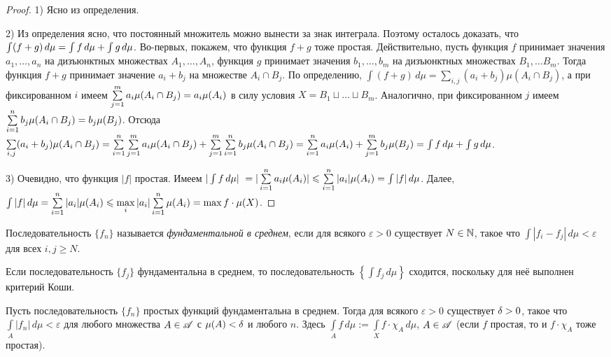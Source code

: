 \documentclass[10pt]{article}
\newcommand{\ve}{\varepsilon}
\begin{document}
\begin{proof}
1) Ясно из определения.

2) Из определения ясно, что постоянный множитель можно вынести за
знак интеграла. Поэтому осталось доказать, что $\int(f+g)\,d\mu
\bw=\int f\,d\mu+\int g\,d\mu$. Во-первых, покажем, что функция
$f+g$ тоже простая. Действительно, пусть функция $f$ принимает
значения $a_1,\ldots,a_n$ на дизъюнктных множествах
$A_1,\ldots,A_n$, функция $g$ принимает значения $b_1,\ldots,b_m$ на
дизъюнктных множествах $B_1,\ldots B_m$. Тогда функция $f+g$
принимает значение $a_i+b_j$ на множестве $A_i\cap B_j$. По
определению, $\int(f+g)\,d\mu=\sum\limits_{i,j}(a_i+b_j)\mu(A_i\cap
B_j)$, а при фиксированном $i$ имеем
$\sum\limits_{j=1}^ma_i\mu(A_i\cap B_j)\bw =a_i\mu(A_i)$ в силу
условия $X=B_1\sqcup\ldots\sqcup B_m$. Аналогично, при фиксированном
$j$ имеем $\sum\limits_{i=1}^nb_j\mu(A_i\bw \cap B_j)=b_j\mu(B_j)$.
Отсюда $\sum\limits_{i,j}(a_i+b_j)\mu(A_i\bw \cap B_j)\bw
=\sum\limits_{i=1}^n \sum\limits_{j=1}^ma_i\mu(A_i\bw \cap B_j)\bw
+\sum\limits_{j=1}^m \sum\limits_{i=1}^nb_j\mu(A_i\bw \cap B_j)\bw
=\sum\limits_{i=1}^na_i\mu(A_i)\bw
+\sum\limits_{j=1}^mb_j\mu(B_j)\bw =\int f\,d\mu+\int g\,d\mu$.

3) Очевидно, что функция $|f|$ простая. Имеем $|\int f\,d\mu|\bw\
=|\sum\limits_{i=1}^na_i\mu(A_i)|\bw
\le\sum\limits_{i=1}^n|a_i|\mu(A_i)\bw =\int|f|\,d\mu$. Далее,
$\int|f|\,d\mu\bw =\sum\limits_{i=1}^n|a_i|\mu(A_i)\bw
\le\max\limits_i|a_i|\sum\limits_{i=1}^n\mu(A_i)=\max f\cdot
\mu(X)$.
\end{proof}

\begin{df}
Последовательность $\{f_n\}$ называется \emph{фундаментальной в
среднем}, если для всякого $\ve>0$ существует $N\in\mathbb{N}$, такое что
$\int|f_i-f_j|\,d\mu<\ve$ для всех $i,j\ge N$.
\end{df}

\begin{note}
Если последовательность $\{f_j\}$ фундаментальна в среднем, то
последовательность $\left\{\int f_j\,d\mu\right\}$ сходится,
поскольку для неё выполнен критерий Коши.
\end{note}

\begin{lemma}\label{fund_average}
Пусть последовательность $\{f_n\}$ простых функций фундаментальна в
среднем. Тогда для всякого $\ve>0$ существует $\delta>0$, такое что
$\int\limits_A|f_n|\,d\mu<\ve$ для любого множества $A\in\mathscr{A}$ с
$\mu(A)<\delta$ и любого $n$. Здесь $\int\limits_A
f\,d\mu:=\int\limits_X f\cdot\chi_A\,d\mu$, $A\in\mathscr{A}$ (если $f$
простая, то и $f\cdot \chi_A$ тоже простая).
\end{lemma}
\end{document}
